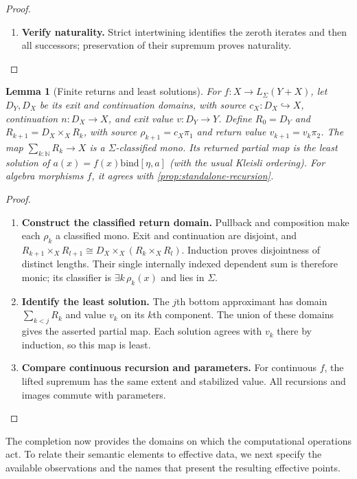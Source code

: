 \documentclass[11pt,a4paper]{article}
\numberwithin{algorithm}{section}
\numberwithin{equation}{section}
\newtheorem{lemma}[lemma]{Lemma}
\theoremstyle{definition}
\theoremstyle{remark}
\theoremstyle{plain}
\newcommand{\N}{\mathbb N}
\newcommand{\LL}{L_{\Sigma}}
\newcommand{\incl}{\hookrightarrow}
\newcommand{\bind}{\mathbin{\mathrm{bind}}}
\theoremstyle{definition}
\theoremstyle{plain}
\begin{document}
\begin{proof}
\begin{enumerate}[leftmargin=*,align=left]
\item \textbf{Verify naturality.}
Strict intertwining identifies the zeroth iterates and then all
successors; preservation of their supremum proves naturality.
\end{enumerate}
\end{proof}

\begin{lemma}[Finite returns and least solutions]\label{lem:standalone-return}
For $f:X\to\LL(Y+X)$, let $D_Y,D_X$ be its exit and continuation
domains, with source $c_X:D_X\incl X$, continuation $n:D_X\to X$,
and exit value $v:D_Y\to Y$.
Define $R_0=D_Y$ and $R_{k+1}=D_X\times_XR_k$, with source
$\rho_{k+1}=c_X\pi_1$ and return value $v_{k+1}=v_k\pi_2$.
The map $\sum_{k:\N}R_k\to X$ is a $\Sigma$-classified mono.
Its returned partial map is the least solution of
$a(x)=f(x)\bind[\eta,a]$ (with the usual Kleisli ordering).
For algebra morphisms $f$, it agrees with
\cref{prop:standalone-recursion}.
\end{lemma}
\begin{proof}\leavevmode
\begin{enumerate}[leftmargin=*,align=left]
\item \textbf{Construct the classified return domain.}
Pullback and composition make each $\rho_k$ a classified mono.
Exit and continuation are disjoint, and
$R_{k+1}\times_XR_{l+1}\cong
D_X\times_X(R_k\times_XR_l)$.
Induction proves disjointness of distinct lengths. Their single
internally indexed dependent sum is therefore monic; its classifier
is $\exists k\,\rho_k(x)$ and lies in $\Sigma$.

\item \textbf{Identify the least solution.}
The $j$th bottom approximant has domain $\sum_{k<j}R_k$ and
value $v_k$ on its $k$th component. The union of these domains
gives the asserted partial map. Each solution agrees with $v_k$
there by induction, so this map is least.

\item \textbf{Compare continuous recursion and parameters.}
For continuous $f$,
the lifted supremum has the same extent and stabilized value.
All recursions and images commute with parameters.
\end{enumerate}
\end{proof}

The completion now provides the domains on which the computational
operations act. To relate their semantic elements to effective data,
we next specify the available observations and the names that present
the resulting effective points.
\end{document}
